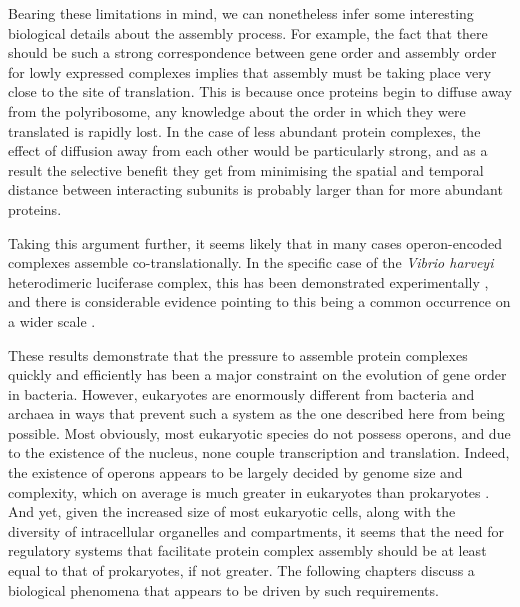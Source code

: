 \documentclass[a4paper,11pt,twoside,openright]{scrbook}
\begin{document}
Bearing these limitations in mind, we can nonetheless infer some interesting biological details about the assembly process. For example, the fact that there should be such a strong correspondence between gene order and assembly order for lowly expressed complexes implies that assembly must be taking place very close to the site of translation. This is because once proteins begin to diffuse away from the polyribosome, any knowledge about the order in which they were translated is rapidly lost. In the case of less abundant protein complexes, the effect of diffusion away from each other would be particularly strong, and as a result the selective benefit they get from minimising the spatial and temporal distance between interacting subunits is probably larger than for more abundant proteins.

Taking this argument further, it seems likely that in many cases operon-encoded complexes assemble co-translationally. In the specific case of the \textit{Vibrio harveyi} heterodimeric luciferase complex, this has been demonstrated experimentally \cite{Shieh2015a}, and there is considerable evidence pointing to this being a common occurrence on a wider scale \cite{Duncan2011,Wells2015,Natan2017}.

These results demonstrate that the pressure to assemble protein complexes quickly and efficiently has been a major constraint on the evolution of gene order in bacteria. However, eukaryotes are enormously different from bacteria and archaea in ways that prevent such a system as the one described here from being possible. Most obviously, most eukaryotic species do not possess operons, and due to the existence of the nucleus, none couple transcription and translation. Indeed, the existence of operons appears to be largely decided by genome size and complexity, which on average is much greater in eukaryotes than prokaryotes \cite{Nunez2013}. And yet, given the increased size of most eukaryotic cells, along with the diversity of intracellular organelles and compartments, it seems that the need for regulatory systems that facilitate protein complex assembly should be at least equal to that of prokaryotes, if not greater. The following chapters discuss a biological phenomena that appears to be driven by such requirements.

\clearpage
\end{document}

